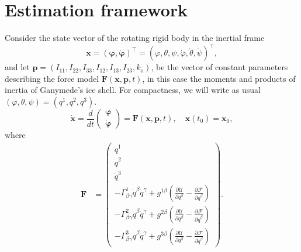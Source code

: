 \documentclass[pdflatex,sn-mathphys-num]{sn-jnl}%
\theoremstyle{thmstyleone}%
\theoremstyle{thmstyletwo}%
\theoremstyle{thmstylethree}%
\renewcommand{\vec}[1]{\boldsymbol{#1}}
\begin{document}
\section{Estimation framework}\label{sec:DC_laser}
Consider the state vector of the rotating rigid body in the inertial frame
\begin{equation}
	\vec{x} = 
		( \vec{\varphi}, \dot{\vec{\varphi}})^\top = %
		(\varphi,\theta,\psi,\dot{\varphi},\dot{\theta},\dot{\psi}
		)^\top, 
\end{equation}
and let  $\vec{p} = (I_{11}, I_{22}, I_{33}, I_{12}, I_{13}, I_{23}, k_\mathrm{o}) $,
be the  vector of constant parameters describing the force model $ \vec{F}(\vec{x}, \vec{p}, t ) $, in this case the moments and products of inertia of Ganymede's ice shell.
%
For compactness, we will write as usual $(\varphi,\theta,\psi)=(q^1,q^2,q^3)$.
%
\begin{equation}\label{eom}
	\dot{\vec{x} } = \frac{d}{dt}
	\begin{pmatrix}
		\vec{\varphi} \\
		\dot{\vec{\varphi}}
	\end{pmatrix}
	= \vec{F}(\vec{x}, \vec{p}, t ),
	\quad \vec{x}(t_0) = \vec{x}_0,
\end{equation}
where 
\begin{align}
	\vec{F} &= 
	\begin{pmatrix}
	\dot{q}^1 \\ \dot{q}^2 \\ \dot{q}^3 \\
	-{\Gamma}^{1}_{\beta\gamma} \dot{q}^\beta \dot{q}^\gamma 
	+{g}^{1\beta} 
	\left(
	\frac{\partial \mathcal{U}}{\partial q^\beta}
	 - \frac{\partial \mathcal{F}}{\partial \dot{q}^\beta} 
	\right)
	\\%
	-{\Gamma}^{2}_{\beta\gamma} \dot{q}^\beta \dot{q}^\gamma 
	+{g}^{2\beta} 
	\left(
	\frac{\partial \mathcal{U}}{\partial q^\beta} 
	- \frac{\partial \mathcal{F}}{\partial \dot{q}^\beta} 
	\right)
	\\ 
	-{\Gamma}^{3}_{\beta\gamma} \dot{q}^\beta \dot{q}^\gamma 
	+{g}^{3\beta} 
	\left(
	\frac{\partial \mathcal{U}}{\partial q^\beta}
	- \frac{\partial \mathcal{F}}{\partial \dot{q}^\beta} 
	\right)
	\end{pmatrix}.
\end{align}
\end{document}
